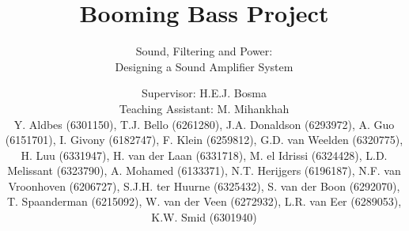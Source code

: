 \documentclass{tudelft-report}
\begin{document}
\frontmatter

\title{Booming Bass Project}
\subtitle{Sound, Filtering and Power: \\ Designing a Sound Amplifier System}
\author{\large Supervisor: H.E.J. Bosma \\ Teaching Assistant: M. Mihankhah \\Y. Aldbes (6301150), T.J. Bello (6261280), J.A. Donaldson (6293972), A. Guo (6151701), I. Givony (6182747), F. Klein (6259812), G.D. van Weelden (6320775), H. Luu (6331947), H. van der Laan (6331718), M. el Idrissi (6324428), L.D. Melissant (6323790), A. Mohamed (6133371), N.T. Herijgers (6196187), N.F. van Vroonhoven (6206727), S.J.H. ter Huurne (6325432), S. van der Boon (6292070), T. Spaanderman (6215092), W. van der Veen (6272932), L.R. van Eer (6289053), K.W. Smid (6301940)}

\subject{EE1L1: Integrated Project 1} %

\makecover





\tableofcontents




\mainmatter













%
%
%
%
\end{document}
